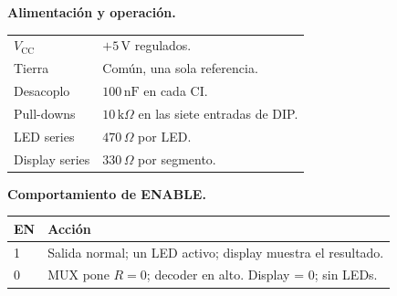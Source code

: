\documentclass[a4paper,10pt]{article}
\begin{document}
\begin{minipage}[t]{0.36\textwidth}
  \textbf{Alimentaci\'{o}n y operaci\'{o}n.}
  \vspace{2pt}
  \footnotesize
  \begin{tabularx}{\linewidth}{l X}
    \toprule
    $V_\text{CC}$  & $+5\,\mathrm{V}$ regulados.\\
    Tierra         & Com\'{u}n, una sola referencia.\\
    Desacoplo      & $100\,\mathrm{nF}$ en cada CI.\\
    Pull-downs     & $10\,\mathrm{k}\Omega$ en las siete entradas de DIP.\\
    LED series     & $470\,\Omega$ por LED.\\
    Display series & $330\,\Omega$ por segmento.\\
    \bottomrule
  \end{tabularx}

  \vspace{6pt}
  \textbf{Comportamiento de ENABLE.}
  \vspace{2pt}
  \begin{tabularx}{\linewidth}{l X}
    \toprule
    EN & Acci\'{o}n\\
    \midrule
    1 & Salida normal; un LED activo; display muestra el resultado.\\
    0 & MUX pone $R=0$; decoder en alto. Display = 0; sin LEDs.\\
    \bottomrule
  \end{tabularx}

\end{minipage}
\end{document}
